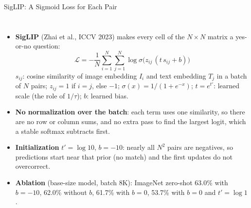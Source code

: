 \begin{frame}{SigLIP: A Sigmoid Loss for Each Pair}
  \begin{columns}[T,onlytextwidth]
      \begin{itemize}\footnotesize\itemsep0.3em
        \item \textbf{SigLIP} (Zhai et al., ICCV 2023) makes every cell of the $N\times N$ matrix a yes-or-no question:
        \[ \mathcal{L} = -\frac{1}{N}\sum_{i=1}^{N}\sum_{j=1}^{N}\log\sigma\big(z_{ij}\,(t\,s_{ij}+b)\big) \]
        $s_{ij}$: cosine similarity of image embedding $I_i$ and text embedding $T_j$ in a batch of $N$ pairs; $z_{ij}=1$ if $i=j$, else $-1$; $\sigma(x)=1/(1+e^{-x})$; $t=e^{t'}$: learned scale (the role of $1/\tau$); $b$: learned bias.
        \item \textbf{No normalization over the batch}: each term uses one similarity, so there are no row or column sums, and no extra pass to find the largest logit, which a stable softmax subtracts first.
        \item \textbf{Initialization} $t'=\log 10$, $b=-10$: nearly all $N^2$ pairs are negatives, so predictions start near that prior (no match) and the first updates do not overcorrect.
        \item \textbf{Ablation} (base-size model, batch 8K): ImageNet zero-shot 63.0\% with $b=-10$, 62.0\% without $b$, 61.7\% with $b=0$, 53.7\% with $b=0$ and $t'=\log 1$.
      \end{itemize}
      \centering
      \vspace{0.2em}
\end{columns}
\end{frame}

